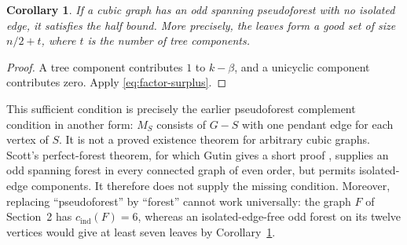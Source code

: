 \documentclass[11pt]{article}
\newtheorem{corollary}[theorem]{Corollary}
\newcommand{\cind}{c_{\mathrm{ind}}}
\begin{document}
\begin{corollary}\label{cor:odd-pseudoforest}
If a cubic graph has an odd spanning pseudoforest with no isolated
edge, it satisfies the half bound. More precisely, the leaves form
a good set of size $n/2+t$, where $t$ is the number of tree components.
\end{corollary}
\begin{proof}
A tree component contributes $1$ to $k-\beta$, and a unicyclic
component contributes zero. Apply \eqref{eq:factor-surplus}.
\end{proof}

This sufficient condition is precisely the earlier pseudoforest
complement condition in another form: $M_S$ consists of $G-S$ with
one pendant edge for each vertex of $S$. It is not a proved existence
theorem for arbitrary cubic graphs. Scott's perfect-forest theorem,
for which Gutin gives a short proof \cite{Gutin}, supplies an odd
spanning forest in every connected graph of even order, but permits
isolated-edge components. It therefore does not supply the missing
condition. Moreover, replacing ``pseudoforest'' by ``forest'' cannot
work universally: the graph $F$ of Section~2 has $\cind(F)=6$, whereas
an isolated-edge-free odd forest on its twelve vertices would give
at least seven leaves by Corollary~\ref{cor:odd-pseudoforest}.
\end{document}
